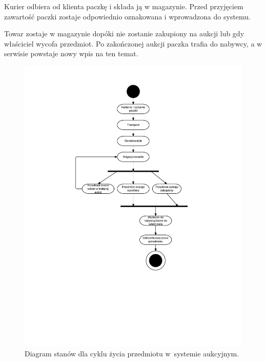 \documentclass[10pt,a4paper]{article}
\begin{document}
Kurier odbiera od klienta paczkę i składa ją w magazynie. Przed przyjęciem
zawartość paczki zostaje odpowiednio oznakowana i wprowadzona do systemu.

Towar zostaje w magazynie dopóki nie zostanie zakupiony na aukcji lub gdy
właściciel wycofa przedmiot. Po zakończonej aukcji paczka trafia do nabywcy, a
w serwisie powstaje nowy wpis na ten temat.

\newpage
\begin{figure}[p]
  \begin{adjustwidth}{-3cm}{-3cm}
    \centering
    \includegraphics{figury/stan-przedmiot}
    \caption{Diagram stanów dla cyklu życia przedmiotu w~systemie aukcyjnym.}
    \label{fig:stan_przedmiot}
  \end{adjustwidth}
\end{figure}
\clearpage
\end{document}
